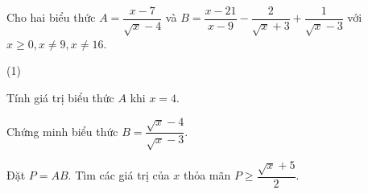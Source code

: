 
\begin{bt}
Cho hai biểu thức $A = \dfrac{x-7}{\sqrt{x}-4}$ và $B = \dfrac{x-21}{x-9} - \dfrac{2}{\sqrt{x}+3} + \dfrac{1}{\sqrt{x}-3}$ với $x \ge 0, x \ne 9, x \ne 16$.
\begin{cacy}(1)
\item Tính giá trị biểu thức $A$ khi $x = 4$.
\item Chứng minh biểu thức $B = \dfrac{\sqrt{x}-4}{\sqrt{x}-3}$.
\item Đặt $P = AB$. Tìm các giá trị của $x$ thỏa mãn $P \ge \dfrac{\sqrt{x}+5}{2}$.
\end{cacy}
\loigiai{}
\end{bt}
